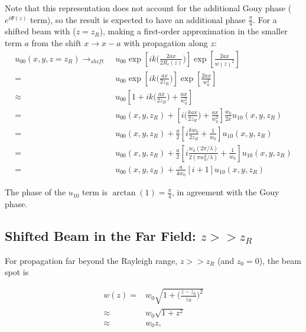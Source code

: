 \documentclass[aps,twoside,secnumarabic,balancelastpage,amsmath,amssymb,nofootinbib,hyperref=pdftex]{revtex4}
\newcommand{\bigfrac}[2]{\Big( \frac{#1}{#2}\Big)}
\begin{document}
Note that this representation does not account for the additional Gouy phase ($e^{i\Psi(z)}$ term), so the result is expected to have an additional phase $\frac{\pi}{4}$. For a shifted beam with ($z=z_R$), making a first-order approximation in the smaller term $a$ from the shift $x\rightarrow x-a$ with propagation along $z$:
	\begin{align}\label{eq:22}
		u_{00} (x,y,z=z_R)
			\rightarrow_{shift} \; & u_{00} \exp 
			\left[ 
				ik \bigfrac{2 a x }{2 R_c(z)} 
			\right] 
			\exp 
			\left[ 
				\frac{2ax}{w(z)^2}
			\right]
		\nonumber\\ 
		= & u_{00} \exp 
			\left[ 
				ik \bigfrac{a x }{2 z_R} 
			\right] 
		\exp 
			\left[ 
				\frac{2ax}{w_0^2}
			\right]		
		\nonumber\\ 
			\approx & u_{00} 
			\left[
				1 + ik \bigfrac{a x}{2z_R} 
				+ \frac{ax}{ w_0^2}
			\right]
			\nonumber\\
			= & 
			u_{00} (x,y,z_R)
			+ 
			\left[
				i\bigfrac{k a x}{2z_R} 
				+ \frac{ax}{w_0^2}
			\right]
			\frac{w_0}{2x} 
			u_{10} (x,y,z_R)
			\nonumber\\						
			= & 
			u_{00}(x,y,z_R) +
			\frac{a}{2}
			 \left[
			 i  \frac{k w_0}{2z_R}
			 +
			 \frac{1}{w_0}
			\right]
			 u_{10}(x,y,z_R)
			 \nonumber\\
			 			= & 
			u_{00}(x,y,z_R) +
			\frac{a}{2}
			 \left[
			 i  \frac{ w_0 (2\pi / \lambda )}
			 {2 (\pi w_0^2  /\lambda)}
			 +
			 \frac{1}{w_0}
			\right]
			 u_{10}(x,y,z_R)
			 \nonumber\\
			 			 			= & 
			u_{00}(x,y,z_R) +
			\frac{a}{4 w_0}
			 \left[
			 i 
			 +
			 1
			\right]
			 u_{10}(x,y,z_R)
	\end{align}

 

The phase of the $u_{10}$ term is $\arctan(1) = \frac{\pi}{4}$, in agreement with the Gouy phase.

\clearpage

\subsection{Shifted Beam in the Far Field: $z >> z_R$}

For propagation far beyond the Rayleigh range, $z >> z_R$ (and $z_0=0$), the beam spot is 

\begin{align*}
w(z)
 =& 
 w_0 \sqrt{1 + \big( \frac{z-z_0}{z_R} \big)^2}
 \\ \approx &
 w_0 \sqrt{1 + z^2}
\\ \approx & 
  w_0 z,
\end{align*}
\end{document}
